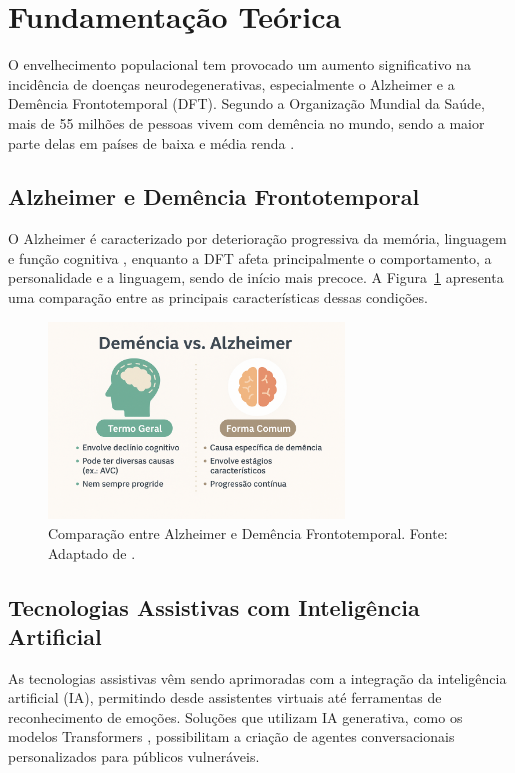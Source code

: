 
\section{Fundamentação Teórica}

O envelhecimento populacional tem provocado um aumento significativo na incidência de doenças neurodegenerativas, especialmente o Alzheimer e a Demência Frontotemporal (DFT). Segundo a Organização Mundial da Saúde, mais de 55 milhões de pessoas vivem com demência no mundo, sendo a maior parte delas em países de baixa e média renda \cite{who2021}.

\subsection{Alzheimer e Demência Frontotemporal}

O Alzheimer é caracterizado por deterioração progressiva da memória, linguagem e função cognitiva \cite{alzheimer-association}, enquanto a DFT afeta principalmente o comportamento, a personalidade e a linguagem, sendo de início mais precoce. A Figura~\ref{fig:comparacao} apresenta uma comparação entre as principais características dessas condições.

\begin{figure}[h]
\centering
\includegraphics[width=0.7\textwidth]{exemplo-demencia-vs-alzheimer.png}
\caption{Comparação entre Alzheimer e Demência Frontotemporal. Fonte: Adaptado de \cite{alzheimer-association}.}
\label{fig:comparacao}
\end{figure}

\subsection{Tecnologias Assistivas com Inteligência Artificial}

As tecnologias assistivas vêm sendo aprimoradas com a integração da inteligência artificial (IA), permitindo desde assistentes virtuais até ferramentas de reconhecimento de emoções. Soluções que utilizam IA generativa, como os modelos Transformers \cite{huggingface2023}, possibilitam a criação de agentes conversacionais personalizados para públicos vulneráveis.

